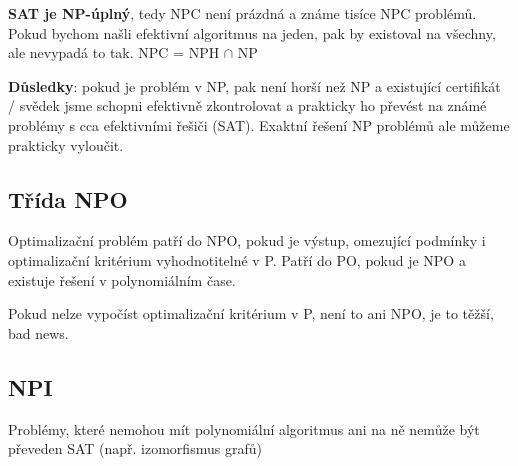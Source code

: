 \textbf{SAT je NP-úplný}, tedy NPC není prázdná a známe tisíce NPC problémů. Pokud bychom našli efektivní algoritmus na jeden, pak by existoval na všechny, ale nevypadá to tak. NPC = NPH $\cap$ NP

\vspace{4pt}
\noindent \textbf{Důsledky}: pokud je problém v NP, pak není horší než NP a existující certifikát / svědek jsme schopni efektivně zkontrolovat a prakticky ho převést na známé problémy s cca efektivními řešiči (SAT). Exaktní řešení NP problémů ale můžeme prakticky vyloučit.

\subsection{Třída NPO}

Optimalizační problém patří do NPO, pokud je výstup, omezující podmínky i optimalizační kritérium vyhodnotitelné v P. Patří do PO, pokud je NPO a existuje řešení v polynomiálním čase.

Pokud nelze vypočíst optimalizační kritérium v P, není to ani NPO, je to těžší, bad news.

\subsection{NPI}

Problémy, které nemohou mít polynomiální algoritmus ani na ně nemůže být převeden SAT (např. izomorfismus grafů)